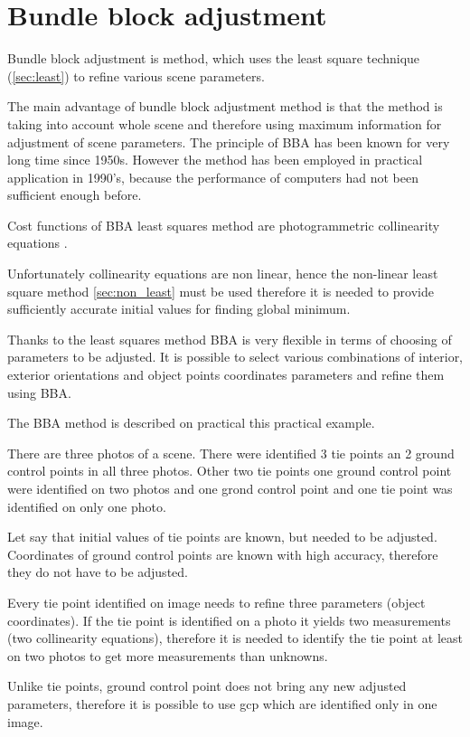 \documentclass[a4paper,12pt]{report}
\begin{document}
\section{Bundle block adjustment}

Bundle block adjustment is method, which uses the least square technique (\ref{sec:least}) to refine  various scene parameters. 

The main advantage of bundle block adjustment method is that the method is taking into account whole scene and therefore using 
maximum information for adjustment of scene parameters. The principle of BBA has been known for very long time since 1950s.
However the method has been employed in practical application in 1990's, because the performance of computers had not been 
sufficient enough before. 

Cost functions of BBA least squares method are photogrammetric collinearity equations \label{eq:p_abbr}.

Unfortunately collinearity equations are non linear, hence the non-linear least square method \ref{sec:non_least} must be used therefore 
it is needed to provide sufficiently accurate initial values for finding global minimum.

Thanks to the least squares method BBA is very flexible in terms of choosing of parameters to be adjusted. 
It is possible to select various combinations of interior, exterior orientations and object points coordinates parameters 
and refine them using BBA. 


The BBA method is described on practical this practical example.


There are three photos of a scene.
There were identified 3 tie points an 2 ground control points in all three photos.
Other two tie points one ground control point were identified on two photos and one grond control point and one tie point was identified 
on only one photo. 

Let say that initial values of tie points are known, but needed to be adjusted.
Coordinates of ground control points are known with high accuracy, therefore they do not have to be adjusted. 

Every tie point identified on image needs to refine three parameters (object coordinates). 
If the tie point is identified on a photo it yields two measurements (two collinearity equations), 
therefore it is needed to identify the tie point at least on two photos to get more measurements 
than unknowns.

Unlike tie points, ground control point does not bring any new adjusted parameters, therefore
it is possible to use gcp which are identified only in one image. 
\end{document}
